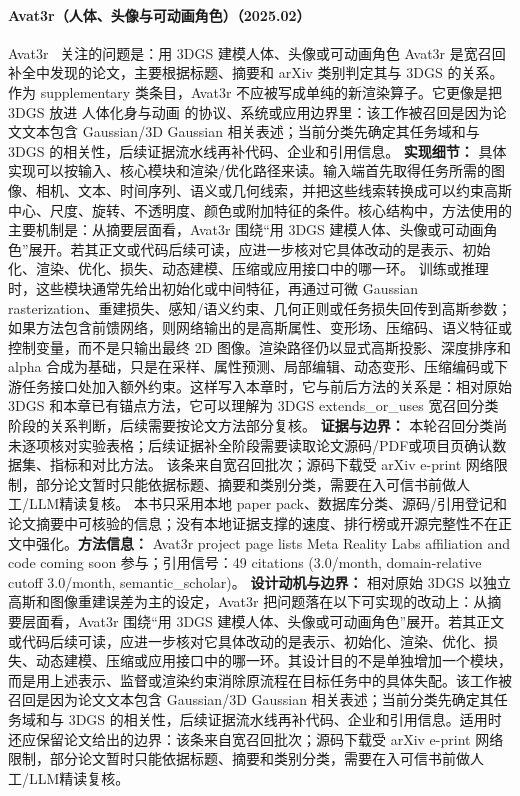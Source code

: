 \paragraph{Avat3r（人体、头像与可动画角色）（2025.02）}
Avat3r~\cite{2502_20220} 关注的问题是：用 3DGS 建模人体、头像或可动画角色 Avat3r 是宽召回补全中发现的论文，主要根据标题、摘要和 arXiv 类别判定其与 3DGS 的关系。
作为 supplementary 类条目，Avat3r 不应被写成单纯的新渲染算子。它更像是把 3DGS 放进 人体化身与动画 的协议、系统或应用边界里：该工作被召回是因为论文文本包含 Gaussian/3D Gaussian 相关表述；当前分类先确定其任务域和与 3DGS 的相关性，后续证据流水线再补代码、企业和引用信息。
\textbf{实现细节：} 具体实现可以按输入、核心模块和渲染/优化路径来读。输入端首先取得任务所需的图像、相机、文本、时间序列、语义或几何线索，并把这些线索转换成可以约束高斯中心、尺度、旋转、不透明度、颜色或附加特征的条件。核心结构中，方法使用的主要机制是：从摘要层面看，Avat3r 围绕“用 3DGS 建模人体、头像或可动画角色”展开。若其正文或代码后续可读，应进一步核对它具体改动的是表示、初始化、渲染、优化、损失、动态建模、压缩或应用接口中的哪一环。 训练或推理时，这些模块通常先给出初始化或中间特征，再通过可微 Gaussian rasterization、重建损失、感知/语义约束、几何正则或任务损失回传到高斯参数；如果方法包含前馈网络，则网络输出的是高斯属性、变形场、压缩码、语义特征或控制变量，而不是只输出最终 2D 图像。渲染路径仍以显式高斯投影、深度排序和 alpha 合成为基础，只是在采样、属性预测、局部编辑、动态变形、压缩编码或下游任务接口处加入额外约束。这样写入本章时，它与前后方法的关系是：相对原始 3DGS 和本章已有锚点方法，它可以理解为 3DGS extends\_or\_uses 宽召回分类阶段的关系判断，后续需要按论文方法部分复核。
\textbf{证据与边界：} 本轮召回分类尚未逐项核对实验表格；后续证据补全阶段需要读取论文源码/PDF或项目页确认数据集、指标和对比方法。 该条来自宽召回批次；源码下载受 arXiv e-print 网络限制，部分论文暂时只能依据标题、摘要和类别分类，需要在入可信书前做人工/LLM精读复核。 本书只采用本地 paper pack、数据库分类、源码/引用登记和论文摘要中可核验的信息；没有本地证据支撑的速度、排行榜或开源完整性不在正文中强化。\textbf{方法信息：} Avat3r project page lists Meta Reality Labs affiliation and code coming soon 参与；引用信号：49 citations (3.0/month, domain-relative cutoff 3.0/month, semantic\_scholar)。
\textbf{设计动机与边界：} 相对原始 3DGS 以独立高斯和图像重建误差为主的设定，Avat3r 把问题落在以下可实现的改动上：从摘要层面看，Avat3r 围绕“用 3DGS 建模人体、头像或可动画角色”展开。若其正文或代码后续可读，应进一步核对它具体改动的是表示、初始化、渲染、优化、损失、动态建模、压缩或应用接口中的哪一环。其设计目的不是单独增加一个模块，而是用上述表示、监督或渲染约束消除原流程在目标任务中的具体失配。该工作被召回是因为论文文本包含 Gaussian/3D Gaussian 相关表述；当前分类先确定其任务域和与 3DGS 的相关性，后续证据流水线再补代码、企业和引用信息。适用时还应保留论文给出的边界：该条来自宽召回批次；源码下载受 arXiv e-print 网络限制，部分论文暂时只能依据标题、摘要和类别分类，需要在入可信书前做人工/LLM精读复核。
